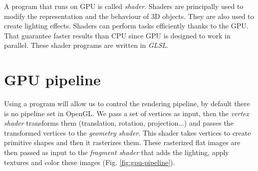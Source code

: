 A program that runs on GPU is called \textit{shader}. Shaders are principally used to modify the representation and the behaviour of 3D objects. They are also used to create lighting effects.  Shaders can perform tasks efficiently thanks to the GPU. That guarantee faster results than CPU since GPU is designed to work in parallel.
These shader programs are written in \textit{GLSL}.

\section{GPU pipeline}
Using a program will allow us to control the rendering pipeline, by default there is no pipeline set in OpenGL. We pass a set of vertices as input, then the \textit{vertex shader} transforms them (translation, rotation, projection...) and passes the transformed vertices to the \textit{geometry shader}. This shader takes vertices to create primitive shapes and then it rasterizes them. These rasterized flat images are then passed as input to the \textit{fragment shader} that adds the lighting, apply textures and color these images (Fig. \ref{fig:gpu-pipeline}).

